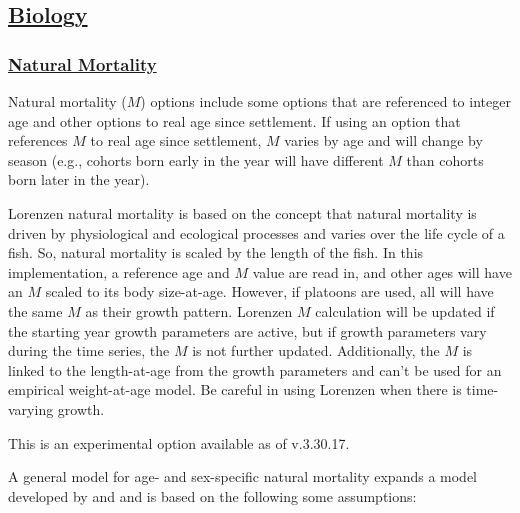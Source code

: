 \hypertarget{Biology}{}
\subsection[Biology]{\protect\hyperlink{Biology}{Biology}}
\hypertarget{NatM}{}
\subsubsection[Natural Mortality]{\protect\hyperlink{NatM}{Natural Mortality}}
Natural mortality ($M$) options include some options that are referenced to integer age and other options to real age since settlement. If using an option that references $M$ to real age since settlement, $M$ varies by age and will change by season (e.g., cohorts born early in the year will have different $M$ than cohorts born later in the year).

Lorenzen natural mortality is based on the concept that natural mortality is driven by physiological and ecological processes and varies over the life cycle of a fish. So, natural mortality is scaled by the length of the fish. In this implementation, a reference age and $M$ value are read in, and other ages will have an $M$ scaled to its body size-at-age. However, if platoons are used, all will have the same $M$ as their growth pattern. Lorenzen $M$ calculation will be updated if the starting year growth parameters are active, but if growth parameters vary during the time series, the $M$ is not further updated. Additionally, the $M$ is linked to the length-at-age from the growth parameters and can't be used for an empirical weight-at-age model. Be careful in using Lorenzen when there is time-varying growth.


This is an experimental option available as of v.3.30.17. 

A general model for age- and sex-specific natural mortality expands a model developed by \citet{maunder2010bigeye} and \citet{maunder2011M} and is based on the following some assumptions:

